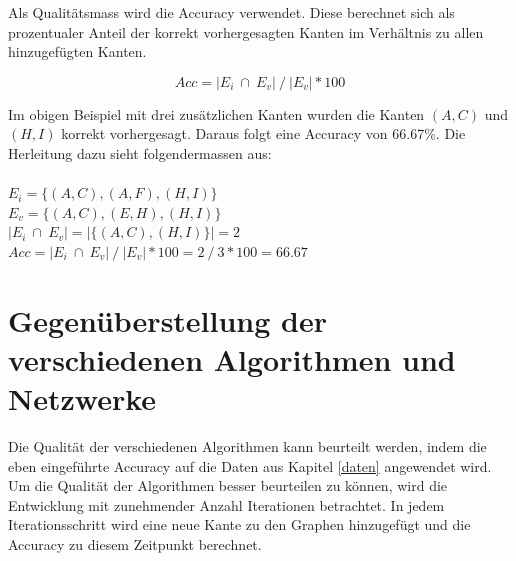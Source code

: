 Als Qualitätsmass wird die Accuracy verwendet.
Diese berechnet sich als prozentualer Anteil der korrekt vorhergesagten Kanten im Verhältnis zu allen hinzugefügten Kanten.

\begin{equation}
    \label{eq:acc}
    Acc = | E_i \ \cap \ E_v| \ / \ |E_v| * 100
\end{equation}

Im obigen Beispiel mit drei zusätzlichen Kanten wurden die Kanten $(A,C)$ und $(H,I)$ korrekt vorhergesagt.
Daraus folgt eine Accuracy von 66.67\%.
Die Herleitung dazu sieht folgendermassen aus:\\
\\
\vspace{4mm}
\forceindent $E_i = \{(A,C), (A,F), (H,I)\}$\\
\vspace{4mm}
\forceindent $E_v = \{(A,C), (E,H), (H,I)\}$\\
\vspace{4mm}
\forceindent $| E_i \ \cap \ E_v| = |\{(A,C), (H,I)\}| = 2$\\
\vspace{4mm}
\forceindent $Acc = | E_i \ \cap \ E_v| \ / \ |E_v| * 100 = 2 \ / \ 3 * 100 = 66.67$\\

\section{Gegenüberstellung der verschiedenen Algorithmen und Netzwerke}
\label{comparison}
Die Qualität der verschiedenen Algorithmen kann beurteilt werden, indem die eben eingeführte Accuracy auf die Daten aus Kapitel \ref{daten} angewendet wird.
Um die Qualität der Algorithmen besser beurteilen zu können, wird die Entwicklung mit zunehmender Anzahl Iterationen betrachtet.
In jedem Iterationsschritt wird eine neue Kante zu den Graphen hinzugefügt und die Accuracy zu diesem Zeitpunkt berechnet.

